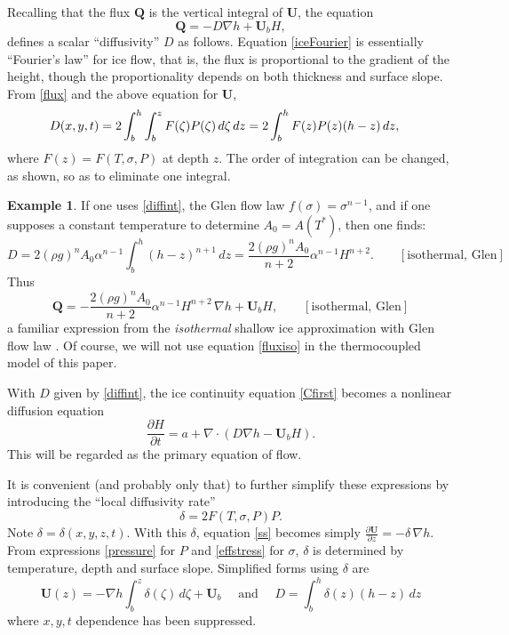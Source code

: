 \documentclass[12pt,final]{amsart}%
\theoremstyle{plain}
\theoremstyle{definition}
\newtheorem*{example}{Example}
\theoremstyle{remark}
\newcommand{\ddt}[1]{\ensuremath{\frac{\partial #1}{\partial t}}}
\newcommand{\ddz}[1]{\ensuremath{\frac{\partial #1}{\partial z}}}
\newcommand{\diverg}{\nabla\cdot}
\newcommand{\grad}{\nabla}
\newcommand{\bQ}{{\mathbf{Q}}}
\newcommand{\bU}{{\mathbf{U}}}
\begin{document}
Recalling that the flux $\bQ$ is the vertical integral of $\bU$, the equation
\begin{equation}\label{iceFourier}
\bQ = - D\grad h + \bU_b H,
\end{equation}
defines a scalar ``diffusivity'' $D$ \citep{vanderVeen} as follows.  Equation \eqref{iceFourier} is essentially ``Fourier's law'' for ice flow, that is, the flux is proportional to the gradient of the height, though the proportionality depends on both thickness and surface slope.  From \eqref{flux} and the above equation for $\bU$,
\begin{align}
\label{diffint} D(x,y,t) &= 2 \int_{b}^h \int_{b}^z F(\zeta) P(\zeta)\,d\zeta\,dz = 2 \int_{b}^h F(z)P(z)(h-z)\,dz,\notag
\end{align}
where $F(z)=F(T,\sigma,P)$ at depth $z$.  The order of integration can be changed, as shown, so as to eliminate one integral.

\begin{example} If one uses \eqref{diffint}, the Glen flow law $f(\sigma)=\sigma^{n-1}$, and if one supposes a constant temperature to determine $A_0=A(T^*)$, then one finds:
    $$D=2(\rho g)^n A_0 \alpha^{n-1} \int_{b}^h (h-z)^{n+1}\,dz=\frac{2(\rho g)^n A_0}{n+2} \alpha^{n-1} H^{n+2}. \qquad [\text{isothermal, Glen}]$$
Thus
\begin{equation}\label{fluxiso}
\bQ=-\frac{2(\rho g)^n A_0}{n+2} \alpha^{n-1} H^{n+2} \, \grad h + \bU_b H, \qquad [\text{isothermal, Glen}]\end{equation}
a familiar expression from the \emph{isothermal} shallow ice approximation with Glen flow law \citep{EISMINT96,Paterson}.  Of course, we will not use equation \eqref{fluxiso} in the thermocoupled model of this paper.\end{example}

With $D$ given by \eqref{diffint}, the ice continuity equation \eqref{Cfirst} becomes a nonlinear diffusion equation
\begin{equation}\label{Cdiffform}
\ddt{H} = a + \diverg \left(D \grad h -\bU_b H\right).
\end{equation}
This will be regarded as the primary equation of flow.

It is convenient (and probably only that) to further simplify these expressions by introducing the ``local diffusivity rate''
    $$\delta = 2 F(T,\sigma,P) P.$$
Note $\delta=\delta(x,y,z,t)$.  With this $\delta$, equation \eqref{ss} becomes simply  $\ddz{\bU} = - \delta \, \grad h$.  From expressions \eqref{pressure} for $P$ and \eqref{effstress} for $\sigma$, $\delta$ is determined by temperature, depth and surface slope.  Simplified forms using $\delta$ are
\begin{equation}\label{UDsimp}
  \bU(z) = - \grad h \int_{b}^z \delta(\zeta) \,d\zeta + \bU_b \quad \text{ and } \quad D = \int_{b}^h \delta(z) (h-z) \,dz
\end{equation}
where $x,y,t$ dependence has been suppressed.
\end{document}
